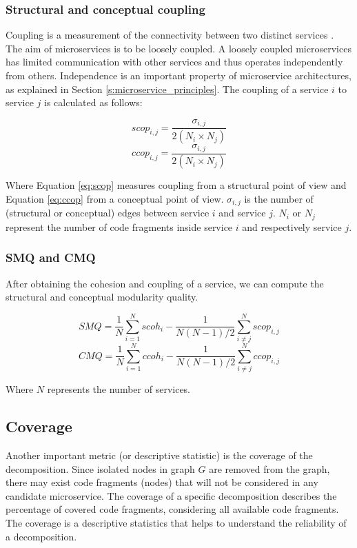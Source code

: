 \subsubsection{Structural and conceptual coupling}
Coupling is a measurement of the connectivity between two distinct services \cite{mancoridis1998using}. The aim of microservices is to be loosely coupled. A loosely coupled microservices has limited communication with other services and thus operates independently from others. Independence is an important property of microservice architectures, as explained in Section \ref{s:microservice_principles}. The coupling of a service $i$ to service $j$ is calculated as follows:

\begin{equation}\label{eq:scop}
    scop_{i,j} = \frac{\sigma_{i,j}}{2(N_i \times N_j)}
\end{equation}
\begin{equation}\label{eq:ccop}
    ccop_{i,j} = \frac{\sigma_{i,j}}{2(N_i \times N_j)}
\end{equation}

Where Equation \ref{eq:scop} measures coupling from a structural point of view and Equation \ref{eq:ccop} from a conceptual point of view. $\sigma_{i,j}$ is the number of (structural or conceptual) edges between service $i$ and service $j$. $N_i$ or $N_j$ represent the number of code fragments inside service $i$ and respectively service $j$.

\subsubsection{SMQ and CMQ}
After obtaining the cohesion and coupling of a service, we can compute the structural and conceptual modularity quality.

\begin{equation}
    SMQ = \frac{1}{N} \sum_{i=1}^{N} scoh_i - \frac{1}{N(N-1)/2} \sum_{i\neq j}^{N} scop_{i,j}
\end{equation}
\begin{equation}
    CMQ = \frac{1}{N} \sum_{i=1}^{N} ccoh_i - \frac{1}{N(N-1)/2} \sum_{i\neq j}^{N} ccop_{i,j}
\end{equation}

Where $N$ represents the number of services.

\subsection{Coverage}
Another important metric (or descriptive statistic) is the coverage of the decomposition. Since isolated nodes in graph $G$ are removed from the graph, there may exist code fragments (nodes) that will not be considered in any candidate microservice. The coverage of a specific decomposition describes the percentage of covered code fragments, considering all available code fragments. The coverage is a descriptive statistics that helps to understand the reliability of a decomposition.\par